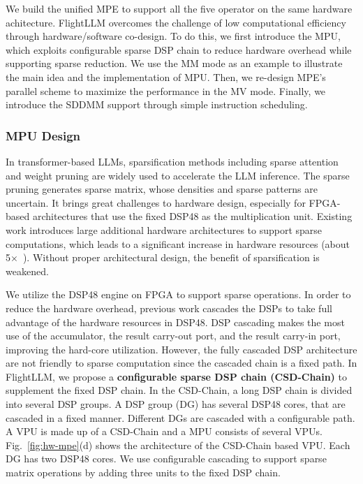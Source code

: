 We build the unified MPE to support all the five operator on the same hardware achitecture. FlightLLM overcomes the challenge of low computational efficiency through hardware/software co-design. 
To do this, we first introduce the MPU, which exploits configurable sparse DSP chain to reduce hardware overhead while supporting sparse reduction. We use the MM mode as an example to illustrate the main idea and the implementation of MPU. Then, we re-design MPE's parallel scheme to maximize the performance in the MV mode. Finally, we introduce the SDDMM support through simple instruction scheduling.


\vspace{-5pt}
\subsubsection{MPU Design}
In transformer-based LLMs, sparsification methods including sparse attention and weight pruning are widely used to accelerate the LLM inference. 
The sparse pruning generates sparse matrix, whose densities and sparse patterns are uncertain. It brings great challenges to hardware design, especially for FPGA-based architectures that use the fixed DSP48 as the multiplication unit. Existing work introduces large additional hardware architectures to support sparse computations, which leads to a significant increase in hardware resources (about 5$\times$~\cite{matraptor-2020}). Without proper architectural design, the benefit of sparsification is weakened.

We utilize the DSP48 engine on FPGA to support sparse operations.
In order to reduce the hardware overhead, previous work cascades the DSPs to take full advantage of the hardware resources in DSP48. DSP cascading makes the most use of the accumulator, the result carry-out port, and the result carry-in port, improving the hard-core utilization. However, the fully cascaded DSP architecture are not friendly to sparse computation since the cascaded chain is a fixed path. 
In FlightLLM, we propose a \textbf{configurable sparse DSP chain (CSD-Chain)} to supplement the fixed DSP chain. In the CSD-Chain, a long DSP chain is divided into several DSP groups. A DSP group (DG) has several DSP48 cores, that are cascaded in a fixed manner.  Different DGs are cascaded with a configurable path. A VPU is made up of a CSD-Chain and a MPU consists of several VPUs. 
Fig.~\ref{fig:hw-mpe}(d) shows the architecture of the CSD-Chain based VPU. Each DG has two DSP48 cores. We use configurable cascading to support sparse matrix operations by adding three units to the fixed DSP chain.

